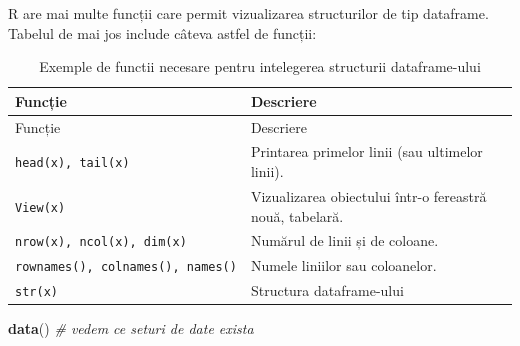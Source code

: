 \documentclass[]{article}
\newenvironment{Shaded}{\begin{snugshade}}{\end{snugshade}}
\newcommand{\KeywordTok}[1]{\textcolor[rgb]{0.13,0.29,0.53}{\textbf{#1}}}
\newcommand{\CommentTok}[1]{\textcolor[rgb]{0.56,0.35,0.01}{\textit{#1}}}
\newcommand{\NormalTok}[1]{#1}
\begin{document}
R are mai multe funcții care permit vizualizarea structurilor de tip
dataframe. Tabelul de mai jos include câteva astfel de funcții:

\begin{longtable}[]{@{}ll@{}}
\caption{Exemple de functii necesare pentru intelegerea structurii
dataframe-ului}\tabularnewline
\toprule
Funcție & Descriere\tabularnewline
\midrule
\endfirsthead
\toprule
Funcție & Descriere\tabularnewline
\midrule
\endhead
\texttt{head(x),\ tail(x)} & Printarea primelor linii (sau ultimelor
linii).\tabularnewline
\texttt{View(x)} & Vizualizarea obiectului într-o fereastră nouă,
tabelară.\tabularnewline
\texttt{nrow(x),\ ncol(x),\ dim(x)} & Numărul de linii și de
coloane.\tabularnewline
\texttt{rownames(),\ colnames(),\ names()} & Numele liniilor sau
coloanelor.\tabularnewline
\texttt{str(x)} & Structura dataframe-ului\tabularnewline
\bottomrule
\end{longtable}

\begin{Shaded}
\begin{Highlighting}[]
\KeywordTok{data}\NormalTok{() }\CommentTok{# vedem ce seturi de date exista}
\end{Highlighting}
\end{Shaded}
\end{document}
